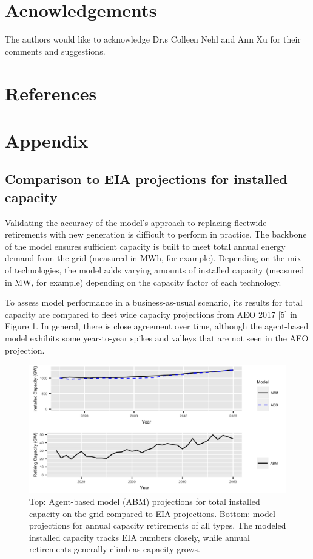 \documentclass[preprint, 12pt]{elsarticle}
\begin{document}
\section{Acnowledgements}

The authors would like to acknowledge Dr.s Colleen Nehl and Ann Xu for their comments and suggestions.

\section{References}



\section{Appendix}


\subsection{Comparison to EIA projections for installed capacity}

Validating the accuracy of the model’s approach to replacing fleetwide retirements with new generation is difficult to perform in practice. The backbone of the model ensures sufficient capacity is built to meet total annual energy demand from the grid (measured in MWh, for example). Depending on the mix of technologies, the model adds varying amounts of installed capacity (measured in MW, for example) depending on the capacity factor of each technology.

To assess model performance in a business-as-usual scenario, its results for total capacity are compared to fleet wide capacity projections from AEO 2017 [5] in Figure 1. In general, there is close agreement over time, although the agent-based model exhibits some year-to-year spikes and valleys that are not seen in the AEO projection.

\begin{figure}
\begin{center}
\includegraphics[scale=.35]{Fig4_1.png}
\end{center}
\caption{Top: Agent-based model (ABM) projections for total installed capacity on the grid compared to EIA projections. Bottom: model projections for annual capacity retirements of all types. The modeled installed capacity tracks EIA numbers closely, while annual retirements generally climb as capacity grows.}
\end{figure}
\end{document}
